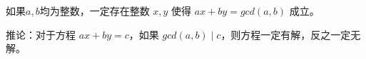 如果$a,b$均为整数，一定存在整数 $x,y$ 使得 $ax+by = gcd(a,b)$ 成立。

推论：对于方程 $ax+by=c$，如果 $gcd(a,b)\mid c$​，则方程一定有解，反之一定无解。